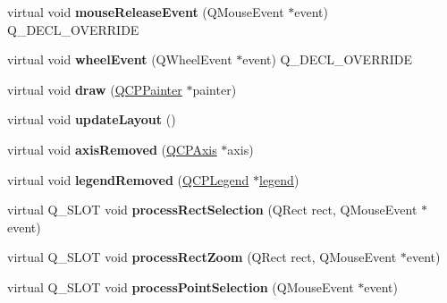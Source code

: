 \begin{DoxyCompactItemize}
\item 
\mbox{\label{class_q_custom_plot_a0fd1a6aa33fce10c15432deecae75233}} 
virtual void {\bfseries mouse\+Release\+Event} (Q\+Mouse\+Event $\ast$event) Q\+\_\+\+D\+E\+C\+L\+\_\+\+O\+V\+E\+R\+R\+I\+DE
\item 
\mbox{\label{class_q_custom_plot_ac70648a6f405e37eaba7d244e0b3cfd1}} 
virtual void {\bfseries wheel\+Event} (Q\+Wheel\+Event $\ast$event) Q\+\_\+\+D\+E\+C\+L\+\_\+\+O\+V\+E\+R\+R\+I\+DE
\item 
\mbox{\label{class_q_custom_plot_a8f21771005776857a1aaeb76a6d3db7e}} 
virtual void {\bfseries draw} (\hyperlink{class_q_c_p_painter}{Q\+C\+P\+Painter} $\ast$painter)
\item 
\mbox{\label{class_q_custom_plot_aeae5e068de2d4c8d19301571f1f0daef}} 
virtual void {\bfseries update\+Layout} ()
\item 
\mbox{\label{class_q_custom_plot_aca64f782a4b96e12d77836c4a2650ad2}} 
virtual void {\bfseries axis\+Removed} (\hyperlink{class_q_c_p_axis}{Q\+C\+P\+Axis} $\ast$axis)
\item 
\mbox{\label{class_q_custom_plot_a281221decdec4a6b5e958d40b77ccef7}} 
virtual void {\bfseries legend\+Removed} (\hyperlink{class_q_c_p_legend}{Q\+C\+P\+Legend} $\ast$\hyperlink{class_q_custom_plot_a4eadcd237dc6a09938b68b16877fa6af}{legend})
\item 
\mbox{\label{class_q_custom_plot_a5d9b02d0fa28820fe1f2f34587c3309a}} 
virtual Q\+\_\+\+S\+L\+OT void {\bfseries process\+Rect\+Selection} (Q\+Rect rect, Q\+Mouse\+Event $\ast$event)
\item 
\mbox{\label{class_q_custom_plot_a66ab7c0b04ef3d44fe60818efb823c32}} 
virtual Q\+\_\+\+S\+L\+OT void {\bfseries process\+Rect\+Zoom} (Q\+Rect rect, Q\+Mouse\+Event $\ast$event)
\item 
\mbox{\label{class_q_custom_plot_acbc612f6be151dd52a3f07df38455f9f}} 
virtual Q\+\_\+\+S\+L\+OT void {\bfseries process\+Point\+Selection} (Q\+Mouse\+Event $\ast$event)

\end{DoxyCompactItemize}
